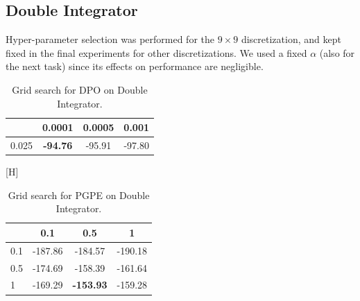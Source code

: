 \subsection*{Double Integrator} 
Hyper-parameter selection was performed for the $9\times 9$ discretization, and kept fixed in the final experiments for other discretizations. We used a fixed $\alpha$ (also for the next task) since its effects on performance are negligible. 
\begin{table}[H]
	\centering
	\begin{tabular}{l|*{3}{c}}
		\toprule
		\backslashbox{$\alpha$}{$\lambda$}
		&0.0001&0.0005&0.001\\
		\midrule
		0.025 & \textbf{-94.76} & -95.91 & -97.80 \\
		\bottomrule
	\end{tabular} \caption{\label{tab:t3}Grid search for \ac{DPO} on Double Integrator.}
\end{table}[H]
\begin{table}[H]
	\centering
	\begin{tabular}{l|*{3}{c}}
		\toprule
		\backslashbox{$\alpha$}{$\sigma$}
		&0.1&0.5&1\\
		\midrule
		0.1 & -187.86 & -184.57 & -190.18 \\
		0.5 & -174.69 & -158.39 & -161.64 \\
		1 & -169.29 & \textbf{-153.93}	 & -159.28 \\
		\bottomrule
	\end{tabular} \caption{\label{tab:t6}Grid search for \ac{PGPE} on Double Integrator.}
\end{table}


